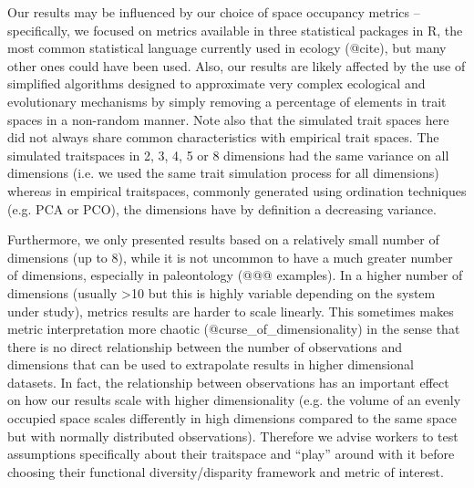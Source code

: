 \documentclass[12pt,letterpaper]{article}
\begin{document}
Our results may be influenced by our choice of space occupancy metrics – specifically, we focused on metrics available in three statistical packages in R, the most common statistical language currently used in ecology (@cite), but many other ones could have been used.
Also, our results are likely affected by the use of simplified algorithms designed to approximate very complex ecological and evolutionary mechanisms by simply removing a percentage of elements in trait spaces in a non-random manner.
Note also that the simulated trait spaces here did not always share common characteristics with empirical trait spaces.
The simulated traitspaces in 2, 3, 4, 5 or 8 dimensions had the same variance on all dimensions (i.e.
we used the same trait simulation process for all dimensions) whereas in empirical traitspaces, commonly generated using ordination techniques (e.g.
PCA or PCO), the dimensions have by definition a decreasing variance.

Furthermore, we only presented results based on a relatively small number of dimensions (up to 8), while it is not uncommon to have a much greater number of dimensions, especially in paleontology (@@@ examples).
In a higher number of dimensions (usually >10 but this is highly variable depending on the system under study), metrics results are harder to scale linearly.
This sometimes makes metric interpretation more chaotic (@curse\_of\_dimensionality) in the sense that there is no direct relationship between the number of observations and dimensions that can be used to extrapolate results in higher dimensional datasets.
In fact, the relationship between observations has an important effect on how our results scale with higher dimensionality (e.g.
the volume of an evenly occupied space scales differently in high dimensions compared to the same space but with normally distributed observations).
Therefore we advise workers to test assumptions specifically about their traitspace and “play” around with it before choosing their functional diversity/disparity framework and metric of interest.
\end{document}
